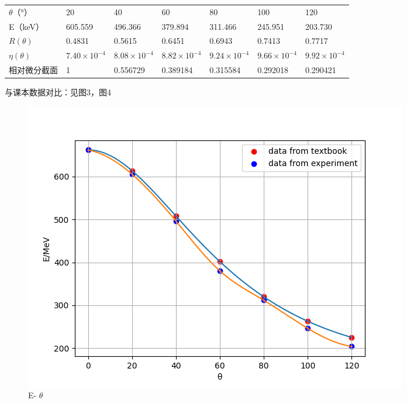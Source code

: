 \documentclass[font=default]{mpltx}
\begin{document}
\begin{table}[!ht]
    \centering
    \begin{tabular}{|l|l|l|l|l|l|l|}
    \hline
$\theta$（°）         & 20                     &40                             &60                   &80                     &100                        &120 \\
E（keV）              & 605.559               &496.366                        &379.894                 &311.466              &245.951                 &203.730 \\
$R(\theta)$          & 0.4831                 &0.5615                           &0.6451              &0.6943                 &0.7413                    &0.7717 \\
$\eta(\theta)$     & $7.40 \times {10}^{-4}$  & $8.08 \times {10}^{-4}$  &$8.82 \times {10}^{-4}$ &$9.24 \times {10}^{-4}$  &$9.66 \times {10}^{-4}$     &$9.92 \times {10}^{-4}$    \\
相对微分截面          & 1                     &0.556729                         &0.389184               &0.315584            &0.292018                     &0.290421  \\
    \end{tabular}
\end{table}

与课本数据对比：见图3，图4

\begin{figure}
  \centering
  \includegraphics[width=0.85\linewidth]{fig/figure_1.png}
  \caption{E- $\theta$}
  \label{sec:figure_1}
\end{figure}
\end{document}
